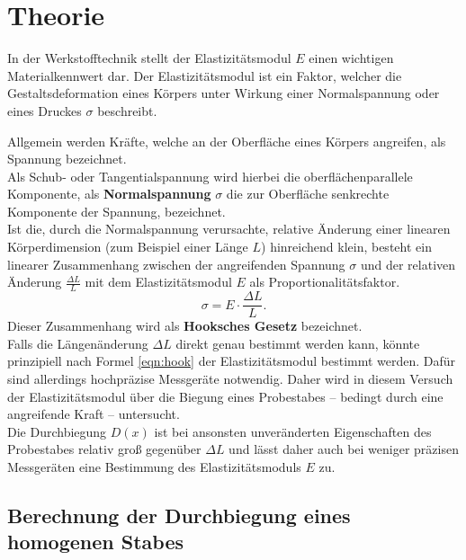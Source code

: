 \section{Theorie}
\label{sec:Theorie}

In der Werkstofftechnik stellt der Elastizitätsmodul $E$ einen wichtigen Materialkennwert dar.
Der Elastizitätsmodul ist ein Faktor, welcher die Gestaltsdeformation eines Körpers unter Wirkung einer Normalspannung oder eines Druckes $\sigma$ beschreibt.

Allgemein werden Kräfte, welche an der Oberfläche eines Körpers angreifen, als Spannung bezeichnet. \\
Als Schub- oder Tangentialspannung wird hierbei die oberflächenparallele Komponente, als \textbf{Normalspannung} $\sigma$ die zur Oberfläche senkrechte Komponente der Spannung, bezeichnet.\\
Ist die, durch die Normalspannung verursachte, relative Änderung einer linearen Körperdimension (zum Beispiel einer Länge $L$) hinreichend klein,
besteht ein linearer Zusammenhang zwischen der angreifenden Spannung $\sigma$ und der relativen Änderung $\frac{\Delta L}{L}$ mit dem Elastizitätsmodul $E$ als Proportionalitätsfaktor.
\begin{equation}
	\label{eqn:hook}
	\sigma=E \cdot \frac{\Delta L}{L} \mathrm{.}
\end{equation}
Dieser Zusammenhang wird als \textbf{Hooksches Gesetz} bezeichnet.\\
Falls die Längenänderung $\Delta L$ direkt genau bestimmt werden kann, könnte prinzipiell nach Formel \eqref{eqn:hook} der Elastizitätsmodul bestimmt werden.
Dafür sind allerdings hochpräzise Messgeräte notwendig. Daher wird in diesem Versuch der Elastizitätsmodul über die Biegung eines Probestabes -- bedingt durch eine angreifende Kraft -- untersucht.\\
Die Durchbiegung $D(x)$ ist bei ansonsten unveränderten Eigenschaften des Probestabes relativ groß gegenüber $\Delta L$ und lässt daher auch bei weniger präzisen Messgeräten eine Bestimmung des Elastizitätsmoduls $E$ zu.

\subsection{Berechnung der Durchbiegung eines homogenen Stabes}

